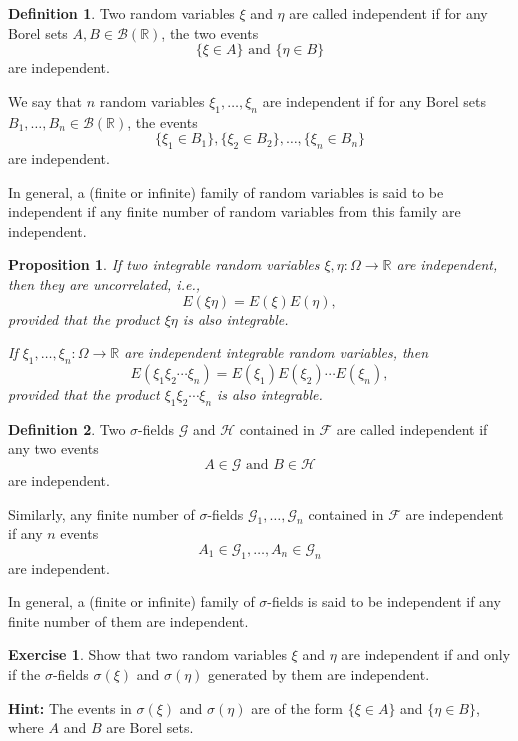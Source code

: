 \documentclass[
]{book}
\newtheorem{proposition}{Proposition}[chapter]
\theoremstyle{definition}
\newtheorem{definition}{Definition}[chapter]
\theoremstyle{definition}
\theoremstyle{definition}
\newtheorem{exercise}{Exercise}[chapter]
\theoremstyle{definition}
\theoremstyle{remark}
\begin{document}
\begin{definition}
\protect\hypertarget{def:unnamed-chunk-32}{}\label{def:unnamed-chunk-32}Two random variables \(\xi\) and \(\eta\) are called independent if for any Borel sets \(A, B \in \mathcal{B}(\mathbb{R})\), the two events
\[
\{ \xi \in A \} \text{ and } \{ \eta \in B \}
\]
are independent.

We say that \(n\) random variables \(\xi_1, \ldots, \xi_n\) are independent if for any Borel sets \(B_1, \ldots, B_n \in \mathcal{B}(\mathbb{R})\), the events
\[
\{ \xi_1 \in B_1 \}, \{ \xi_2 \in B_2 \}, \ldots, \{ \xi_n \in B_n \}
\]
are independent.

In general, a (finite or infinite) family of random variables is said to be independent if any finite number of random variables from this family are independent.
\end{definition}

\begin{proposition}
\protect\hypertarget{prp:unnamed-chunk-33}{}\label{prp:unnamed-chunk-33}If two integrable random variables \(\xi, \eta : \Omega \to \mathbb{R}\) are independent, then they are uncorrelated, i.e.,
\[
E(\xi \eta) = E(\xi) E(\eta),
\]
provided that the product \(\xi \eta\) is also integrable.

If \(\xi_1, \ldots, \xi_n : \Omega \to \mathbb{R}\) are independent integrable random variables, then
\[
E(\xi_1 \xi_2 \cdots \xi_n) = E(\xi_1) E(\xi_2) \cdots E(\xi_n),
\]
provided that the product \(\xi_1 \xi_2 \cdots \xi_n\) is also integrable.
\end{proposition}

\begin{definition}
\protect\hypertarget{def:unnamed-chunk-34}{}\label{def:unnamed-chunk-34}Two \(\sigma\)-fields \(\mathcal{G}\) and \(\mathcal{H}\) contained in \(\mathcal{F}\) are called independent if any two events \[ A \in \mathcal{G} \text{ and }   B \in \mathcal{H} \] are independent.

Similarly, any finite number of \(\sigma\)-fields \(\mathcal{G}_1, \ldots, \mathcal{G}_n\) contained in \(\mathcal{F}\) are independent if any \(n\) events \[ A_1 \in \mathcal{G}_1, \ldots, A_n \in \mathcal{G}_n \] are independent.

In general, a (finite or infinite) family of \(\sigma\)-fields is said to be independent if any finite number of them are independent.
\end{definition}

\begin{exercise}
\protect\hypertarget{exr:unnamed-chunk-35}{}\label{exr:unnamed-chunk-35}Show that two random variables \(\xi\) and \(\eta\) are independent if and only if the \(\sigma\)-fields \(\sigma(\xi)\) and \(\sigma(\eta)\) generated by them are independent.

\textbf{Hint:} The events in \(\sigma(\xi)\) and \(\sigma(\eta)\) are of the form \(\{\xi \in A\}\) and \(\{\eta \in B\}\), where \(A\) and \(B\) are Borel sets.
\end{exercise}
\end{document}
